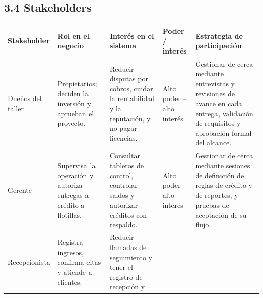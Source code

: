 \subsection{3.4 Stakeholders}\label{stakeholders}

{\def\LTcaptype{none} %
\begin{longtable}[]{@{}
  >{\raggedright\arraybackslash}p{}
  >{\raggedright\arraybackslash}p{}
  >{\raggedright\arraybackslash}p{}
  >{\raggedright\arraybackslash}p{}
  >{\raggedright\arraybackslash}p{}@{}}
\toprule\noalign{}
\begin{minipage}[b]{\linewidth}\raggedright
\textbf{Stakeholder}
\end{minipage} & \begin{minipage}[b]{\linewidth}\raggedright
\textbf{Rol en el negocio}
\end{minipage} & \begin{minipage}[b]{\linewidth}\raggedright
\textbf{Interés en el sistema}
\end{minipage} & \begin{minipage}[b]{\linewidth}\raggedright
\textbf{Poder / interés}
\end{minipage} & \begin{minipage}[b]{\linewidth}\raggedright
\textbf{Estrategia de participación}
\end{minipage} \\
\midrule\noalign{}
\endhead
\bottomrule\noalign{}
\endlastfoot
Dueños del taller & Propietarios; deciden la inversión y aprueban el
proyecto. & Reducir disputas por cobros, cuidar la rentabilidad y la
reputación, y no pagar licencias. & Alto poder -- alto interés &
Gestionar de cerca mediante entrevistas y revisiones de avance en cada
entrega, validación de requisitos y aprobación formal del alcance. \\
Gerente & Supervisa la operación y autoriza entregas a crédito a
flotillas. & Consultar tableros de control, controlar saldos y autorizar
créditos con respaldo. & Alto poder -- alto interés & Gestionar de cerca
mediante sesiones de definición de reglas de crédito y de reportes, y
pruebas de aceptación de su flujo. \\
Recepcionista & Registra ingresos, confirma citas y atiende a clientes.
& Reducir llamadas de seguimiento y tener el registro de recepción y

\end{longtable}}
